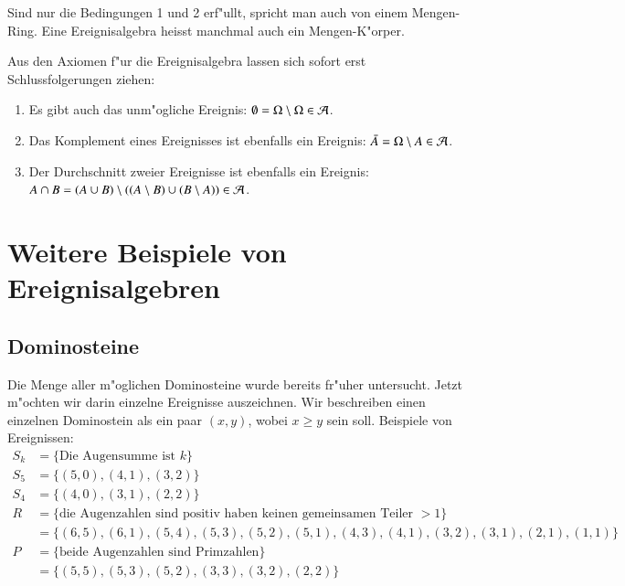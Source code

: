 Sind nur die Bedingungen 1 und 2 erf"ullt, spricht man auch von einem
Mengen-Ring.
Eine Ereignisalgebra heisst manchmal auch ein Mengen-K"orper.

Aus den Axiomen f"ur die Ereignisalgebra lassen sich sofort erst
Schlussfolgerungen ziehen:
\begin{enumerate}
\item Es gibt auch das unm"ogliche Ereignis: $\emptyset = \Omega\setminus\Omega\in{\cal A}$.
\item Das Komplement eines Ereignisses ist ebenfalls ein Ereignis: $\bar A=\Omega\setminus A\in{\cal A}$.
\item Der Durchschnitt zweier Ereignisse ist ebenfalls ein Ereignis: $A\cap B = 
(A\cup B) \setminus ((A\setminus B) \cup (B\setminus A))\in{\cal A}$.
\end{enumerate}

\section{Weitere Beispiele von Ereignisalgebren} \label{section-beispiele}
\subsection{Dominosteine}
Die Menge aller m"oglichen Dominosteine wurde bereits fr"uher untersucht.
Jetzt m"ochten wir darin einzelne Ereignisse auszeichnen.
Wir beschreiben
einen einzelnen Dominostein als ein paar $(x,y)$, wobei $x\ge y$ sein soll.
Beispiele von Ereignissen:
\begin{align*}
S_k&=\{ \text{Die Augensumme ist $k$}\}\\
S_5&=\{ (5,0), (4,1), (3,2) \}\\
S_4&=\{ (4,0), (3,1), (2,2) \}\\
R&=\{\text{die Augenzahlen sind positiv haben keinen gemeinsamen Teiler $>1$}\}\\
 &=\{ (6,5), (6,1), (5,4), (5,3), (5,2), (5,1), (4,3), (4,1), (3,2), (3,1), (2,1), (1,1) \}
\\
P&=\{\text{beide Augenzahlen sind Primzahlen}\}\\
 &=\{(5,5), (5,3), (5,2), (3,3), (3,2), (2,2) \}\\
\end{align*}

